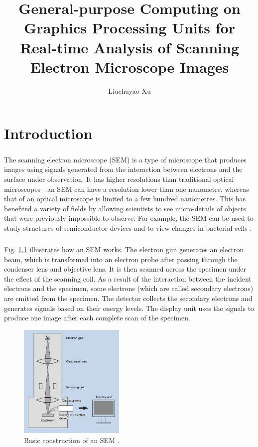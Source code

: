 \documentclass[12pt, twocolumn]{report}
\author{Liuchuyao Xu}
\title{General-purpose Computing on Graphics Processing Units for Real-time Analysis of Scanning Electron Microscope Images}
\begin{document}
\maketitle
\tableofcontents

\begin{abstract}
\end{abstract}

\chapter{Introduction}
\paragraph{}
The scanning electron microscope (SEM) is a type of microscope that produces images using signals generated from the interaction between electrons and the surface under observation. It has higher resolutions than traditional optical microscopes---an SEM can have a resolution lower than one nanometre, whereas that of an optical microscope is limited to a few hundred nanometres. This has benefited a variety of fields by allowing scientists to see micro-details of objects that were previously impossible to observe. For example, the SEM can be used to study structures of semiconductor devices \cite{SEM for semiconductors} and to view changes in bacterial cells \cite{SEM for baterial cells}.

\paragraph{}
Fig. \ref{SEM basic construction} illustrates how an SEM works. The electron gun generates an electron beam, which is transformed into an electron probe after passing through the condenser lens and objective lens. It is then scanned across the specimen under the effect of the scanning coil. As a result of the interaction between the incident electrons and the specimen, some electrons (which are called secondary electrons) are emitted from the specimen. The detector collects the secondary electrons and generates signals based on their energy levels. The display unit uses the signals to produce one image after each complete scan of the specimen.

\begin{figure}[htbp]
    \centering
    \includegraphics[width=0.45\textwidth]{Figures/SEM basic construction.jpg}
    \caption{Basic construction of an SEM \cite{SEM A to Z}.}
    \label{SEM basic construction}
\end{figure}
\end{document}
